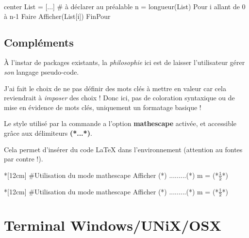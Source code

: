 \documentclass[a4paper,french,11pt]{article}
\newcommand\ctex[1]{\tcbox[vignettelatex]{#1}}
\newcommand\Cle[1]{{\bfseries\sffamily\textlangle #1\textrangle}}
\begin{document}
\begin{codesortie}
\begin{PseudoCodeAlt}[15cm]{center}
List = [...]          # à déclarer au préalable
n = longueur(List)
Pour i allant de 0 à n-1 Faire
	Afficher(List[i])
FinPour
\end{PseudoCodeAlt}
\end{codesortie}

\subsection{Compléments}

\begin{codeattention}
À l'instar de packages existants, la \textit{philosophie} ici est de laisser l'utilisateur gérer \textit{son} langage pseudo-code.

J'ai fait le choix de ne pas définir des \textsf{mots clés} à mettre en valeur car cela reviendrait à \textit{imposer} des choix ! Donc ici, pas de coloration syntaxique ou de mise en évidence de mots clés, uniquement un formatage basique !
\end{codeattention}

\begin{codeinfo}
Le style \ctex{listings} utilisé par la commande a l'option \Cle{mathescape} activée, et accessible grâce aux délimiteurs \Cle{(*...*)}.

Cela permet d'insérer du code \LaTeX{} dans l'environnement \ctex{PseudoCode} (attention au fontes par contre !).
\end{codeinfo}

\begin{codetex}
\begin{PseudoCode}*[12cm]{}
#Utilisation du mode mathescape
Afficher (*\og*) .........(*\fg*)
m = (*$\tfrac{\texttt{1}}{\texttt{2}}$*)
\end{PseudoCode}
\end{codetex}

\begin{codesortie}
\begin{PseudoCode}*[12cm]{}
#Utilisation du mode mathescape
Afficher (*\og*) .........(*\fg*)
m = (*$\tfrac{\texttt{1}}{\texttt{2}}$*)
\end{PseudoCode}
\end{codesortie}

\newpage

\section{Terminal Windows/UNiX/OSX}\label{terms}
\end{document}
